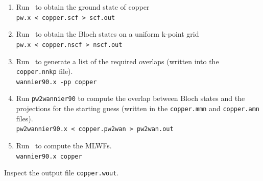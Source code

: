 \documentclass[a4paper,11pt,twoside]{article}
\begin{document}
\begin{enumerate}
\item Run \pwscf\ to obtain the ground state of copper\\
{\tt pw.x < copper.scf > scf.out}

\item Run \pwscf\ to obtain the Bloch states on a uniform k-point grid\\
{\tt pw.x < copper.nscf > nscf.out}

\item Run \wannier\ to generate a list of the required overlaps (written
  into the {\tt copper.nnkp} file).\\ 
{\tt wannier90.x -pp copper}

\item Run {\tt pw2wannier90} to compute the overlap between Bloch
  states and the projections for the starting guess (written in the
  {\tt copper.mmn} and {\tt copper.amn} files).\\  
{\tt pw2wannier90.x < copper.pw2wan > pw2wan.out}

\item Run \wannier\ to compute the MLWFs.\\
{\tt wannier90.x copper}
\end{enumerate}

Inspect the output file {\tt copper.wout}. 
\end{document}
